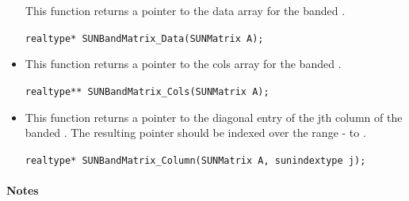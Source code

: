 \begin{itemize}
  This function returns a pointer to the data array for the banded .
 
  \verb|realtype* SUNBandMatrix_Data(SUNMatrix A);|


\item {}

  This function returns a pointer to the cols array for the banded .
 
  \verb|realtype** SUNBandMatrix_Cols(SUNMatrix A);|


\item {}

  This function returns a pointer to the diagonal entry of the jth
  column of the banded .  The resulting pointer should
  be indexed over the range - to . 
 
  \verb|realtype* SUNBandMatrix_Column(SUNMatrix A, sunindextype j);|

\end{itemize}
\paragraph{\bf Notes}                                                      
           
